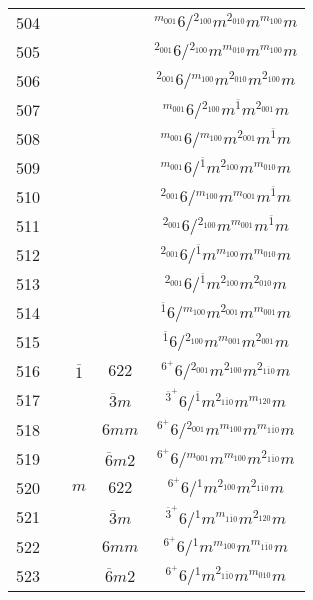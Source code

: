 \begin{longtable}{ccccc}
  504 &  &  &  & ${}^{m_{001}} 6  / {}^{2_{100}} m {}^{2_{010}} m {}^{m_{100}} m $\\
  505 &  &  &  & ${}^{2_{001}} 6  / {}^{2_{100}} m {}^{m_{010}} m {}^{m_{100}} m $\\
  506 &  &  &  & ${}^{2_{001}} 6  / {}^{m_{100}} m {}^{2_{010}} m {}^{2_{100}} m $\\
  507 &  &  &  & ${}^{m_{001}} 6  / {}^{2_{100}} m {}^{\overline{1}} m {}^{2_{001}} m $\\
  508 &  &  &  & ${}^{m_{001}} 6  / {}^{m_{100}} m {}^{2_{001}} m {}^{\overline{1}} m $\\
  509 &  &  &  & ${}^{m_{001}} 6  / {}^{\overline{1}} m {}^{2_{100}} m {}^{m_{010}} m $\\
  510 &  &  &  & ${}^{2_{001}} 6  / {}^{m_{100}} m {}^{m_{001}} m {}^{\overline{1}} m $\\
  511 &  &  &  & ${}^{2_{001}} 6  / {}^{2_{100}} m {}^{m_{001}} m {}^{\overline{1}} m $\\
  512 &  &  &  & ${}^{2_{001}} 6  / {}^{\overline{1}} m {}^{m_{100}} m {}^{m_{010}} m $\\
  513 &  &  &  & ${}^{2_{001}} 6  / {}^{\overline{1}} m {}^{2_{100}} m {}^{2_{010}} m $\\
  514 &  &  &  & ${}^{\overline{1}} 6  / {}^{m_{100}} m {}^{2_{001}} m {}^{m_{001}} m $\\
  515 &  &  &  & ${}^{\overline{1}} 6  / {}^{2_{100}} m {}^{m_{001}} m {}^{2_{001}} m $\\
  516 &  & $\overline{1}$ & $622$ & ${}^{6^{+}} 6  / {}^{2_{001}} m {}^{2_{100}} m {}^{2_{1\overline{1}0}} m $\\
  517 &  &  & $\overline{3}m$ & ${}^{\overline{3}^{+}} 6  / {}^{\overline{1}} m {}^{2_{1\overline{1}0}} m {}^{m_{120}} m $\\
  518 &  &  & $6mm$ & ${}^{6^{+}} 6  / {}^{2_{001}} m {}^{m_{100}} m {}^{m_{1\overline{1}0}} m $\\
  519 &  &  & $\overline{6}m2$ & ${}^{6^{+}} 6  / {}^{m_{001}} m {}^{m_{100}} m {}^{2_{1\overline{1}0}} m $\\
  520 &  & $m$ & $622$ & ${}^{6^{+}} 6  / {}^{1} m {}^{2_{100}} m {}^{2_{1\overline{1}0}} m $\\
  521 &  &  & $\overline{3}m$ & ${}^{\overline{3}^{+}} 6  / {}^{1} m {}^{m_{1\overline{1}0}} m {}^{2_{120}} m $\\
  522 &  &  & $6mm$ & ${}^{6^{+}} 6  / {}^{1} m {}^{m_{100}} m {}^{m_{1\overline{1}0}} m $\\
  523 &  &  & $\overline{6}m2$ & ${}^{6^{+}} 6  / {}^{1} m {}^{2_{1\overline{1}0}} m {}^{m_{010}} m $\\

\end{longtable}
